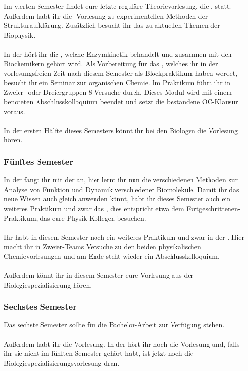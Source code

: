 Im vierten Semester findet eure letzte reguläre Theorievorlesung, die , statt.
Außerdem habt ihr die -Vorlesung zu experimentellen Methoden der Strukturaufklärung. 
Zusätzlich besucht ihr das  zu aktuellen Themen der Biophysik.\\
\bigskip\\
%
In der  hört ihr die , welche Enzymkinetik behandelt und zusammen mit den Biochemikern gehört wird.
Als Vorbereitung für das , welches ihr in der vorlesungsfreien Zeit nach diesem Semester als Blockpraktikum haben werdet, besucht ihr ein Seminar zur organischen Chemie.
Im Praktikum führt ihr in Zweier- oder Dreiergruppen 8 Versuche durch. 
Dieses Modul wird mit einem benoteten Abschlusskolloquium beendet und setzt die bestandene OC-Klausur voraus.\\
\bigskip\\
%
In der ersten Hälfte dieses Semesters könnt ihr bei den Biologen die  Vorlesung hören.

\subsubsection{Fünftes Semester}

In der  fangt ihr mit der  an,
hier lernt ihr nun die verschiedenen Methoden zur Analyse von Funktion und Dynamik verschiedener Biomoleküle.
Damit ihr das neue Wissen auch gleich anwenden könnt, habt ihr dieses Semester auch ein weiteres Praktikum und zwar das ,
dies entspricht etwa dem Fortgeschrittenen-Praktikum, das eure Physik-Kollegen besuchen.\\
\bigskip\\
%
Ihr habt in diesem Semester noch ein weiteres Praktikum und zwar in der .
Hier macht ihr in Zweier-Teams Versuche zu den beiden physikalischen Chemievorlesungen und am Ende steht wieder ein Abschlusskolloquium.\\ 
\bigskip\\
%
Außerdem könnt ihr in diesem Semester eure Vorlesung aus der Biologiespezialisierung hören.

\subsubsection{Sechstes Semester}

Das sechste Semester sollte für die Bachelor-Arbeit zur Verfügung stehen. \\
\bigskip\\
%
Außerdem habt ihr die  Vorlesung.
In der  hört ihr noch die  Vorlesung
und, falls ihr sie nicht im fünften Semester gehört habt, ist jetzt noch die Biologiespezialisierungsvorlesung dran.

